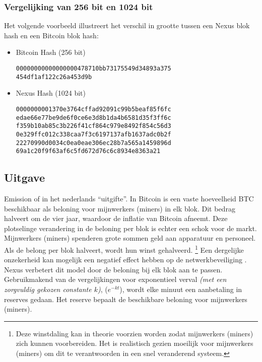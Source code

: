 \documentclass[11pt]{article}
\begin{document}
\subsubsection{Vergelijking van 256 bit en 1024 bit}

Het volgende voorbeeld illustreert het verschil in grootte tussen een Nexus blok hash en een Bitcoin blok hash:

\begin{itemize}
\item Bitcoin Hash (256 bit)
\begin{lstlisting}
00000000000000000478710bb73175549d34893a375
454df1af122c26a453d9b
\end{lstlisting}

\item Nexus Hash (1024 bit)

\begin{lstlisting}
0000000001370e3764cffad92091c99b5beaf85f6fc
edae66e77be9de6f0ce6e3d8b1da4b6581d35f3ff6c
f359b10ab85c3b226f41cf864c979e8492f854c56d3
0e329ffc012c338caa7f3c6197137afb1637adc0b2f
22270990d0034c0ea0eae306ec28b7a565a1459896d
69a1c20f9f63af6c5fd672d76c6c8934e8363a21
\end{lstlisting}
\end{itemize}


\pagebreak
\subsection{Uitgave}

Emission of in het nederlands “uitgifte”. In Bitcoin is een vaste hoeveelheid BTC beschikbaar als beloning voor mijnwerkers (miners) in elk blok. Dit bedrag halveert om de vier jaar, waardoor de inflatie van Bitcoin afneemt. Deze plotselinge verandering in de beloning per blok is echter een schok voor de markt. Mijnwerkers (miners) spenderen grote sommen geld aan apparatuur en personeel. Als de belong per blok halveert, wordt hun winst gehalveerd.
\footnote{Deze winstdaling kan in theorie voorzien worden zodat mijnwerkers (miners) zich kunnen voorbereiden. Het is realistisch gezien moeilijk voor mijnwerkers (miners) om dit te verantwoorden in een snel veranderend systeem.}
Een dergelijke onzekerheid kan mogelijk een negatief effect hebben op de netwerkbeveiliging \cite{cdhalving}.
\noindent Nexus verbetert dit model door de beloning bij elk blok aan te passen. Gebruikmakend van de vergelijkingen voor exponentieel verval \textit{(met een zorgvuldig gekozen constante $k$)}, ($e^{-kt}$), 
wordt elke minuut een aanbetaling in reserves gedaan. Het reserve bepaalt de beschikbare beloning voor mijnwerkers (miners).\\ 
\end{document}
